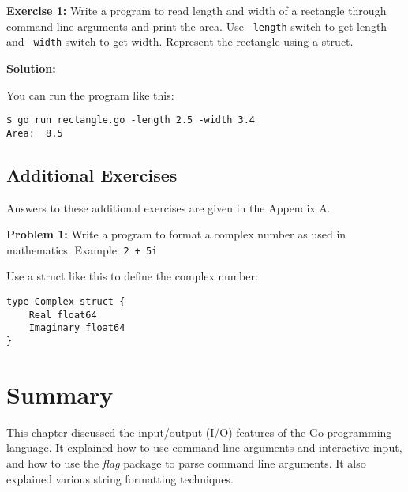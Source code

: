 {\bfseries Exercise 1:} Write a program to read length and width of a
rectangle through command line arguments and print the area.
Use \texttt{-length} switch to get length and \texttt{-width} switch
to get width.  Represent the rectangle using a struct.

\textbf{Solution:}



You can run the program like this:

\begin{lstlisting}[numbers=none]
$ go run rectangle.go -length 2.5 -width 3.4
Area:  8.5
\end{lstlisting}

\subsection{Additional Exercises}

Answers to these additional exercises are given in the Appendix A.

\textbf{Problem 1:} Write a program to format a complex number as used in mathematics.  Example: \texttt{2 + 5i}

Use a struct like this to define the complex number:

\begin{lstlisting}[numbers=none]
type Complex struct {
    Real float64
    Imaginary float64
}
\end{lstlisting}


\section*{Summary}

This chapter discussed the input/output (I/O) features of the Go programming
language. It explained how to use command line arguments and interactive input,
and how to use the \textit{flag} package to parse command line arguments. It
also explained various string formatting techniques.
